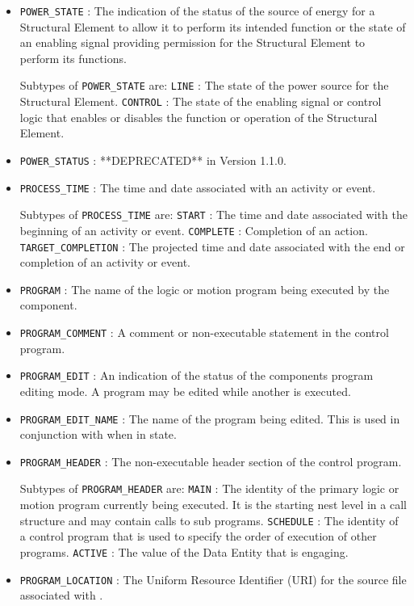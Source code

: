 \begin{itemize}
\item \texttt{POWER_STATE} : The indication of the status of the source of energy for a \gls{Structural Element} to allow it to perform its intended function or the state of an enabling signal providing permission for the \gls{Structural Element} to perform its functions. 

Subtypes of \texttt{POWER_STATE} are: 
\newline\tab \texttt{LINE} : The state of the power source for the \gls{Structural Element}. 
\newline\tab \texttt{CONTROL} : The state of the enabling signal or control logic that enables or disables the function or operation of the \gls{Structural Element}. 
\item \texttt{POWER_STATUS} : **DEPRECATED** in Version 1.1.0. 

\item \texttt{PROCESS_TIME} : The time and date associated with an activity or event. 

Subtypes of \texttt{PROCESS_TIME} are: 
\newline\tab \texttt{START} : The time and date associated with the beginning of an activity or event. 
\newline\tab \texttt{COMPLETE} : Completion of an action. 
\newline\tab \texttt{TARGET_COMPLETION} : The projected time and date associated with the end or completion of an activity or event. 
\item \texttt{PROGRAM} : The name of the logic or motion program being executed by the  component. 

\item \texttt{PROGRAM_COMMENT} : A comment or non-executable statement in the control program. 

\item \texttt{PROGRAM_EDIT} : An indication of the status of the  components program editing mode. A program may be edited while another is executed. 

\item \texttt{PROGRAM_EDIT_NAME} : The name of the program being edited. 
 This is used in conjunction with  when in  state.  

\item \texttt{PROGRAM_HEADER} : The non-executable header section of the control program. 

Subtypes of \texttt{PROGRAM_HEADER} are: 
\newline\tab \texttt{MAIN} : The identity of the primary logic or motion program currently being executed. It is the starting nest level in a call structure and may contain calls to sub programs. 
\newline\tab \texttt{SCHEDULE} : The identity of a control program that is used to specify the order of execution of other programs. 
\newline\tab \texttt{ACTIVE} : The value of the \gls{Data Entity} that is engaging. 
\item \texttt{PROGRAM_LOCATION} : The Uniform Resource Identifier (URI) for the source file associated with . 


\end{itemize}
